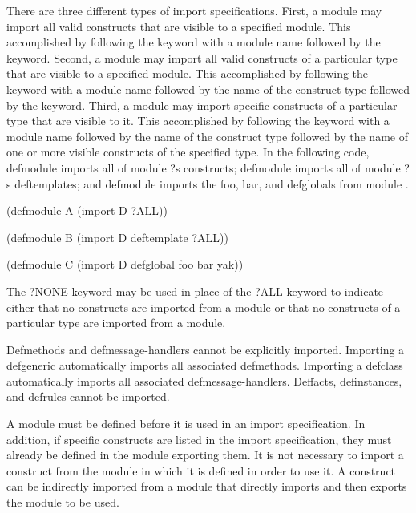 \documentclass[letterpaper,10pt,english]{sphinxmanual}
\begin{document}
There are three different types of import specifications. First, a
module may import all valid constructs that are visible to a specified
module. This accomplished by following the  keyword with a
module name followed by the  keyword. Second, a module may import
all valid constructs of a particular type that are visible to a
specified module. This accomplished by following the  keyword
with a module name followed by the name of the construct type followed
by the  keyword. Third, a module may import specific constructs of
a particular type that are visible to it. This accomplished by following
the  keyword with a module name followed by the name of the
construct type followed by the name of one or more visible constructs of
the specified type. In the following code, defmodule  imports all of
module ?s constructs; defmodule  imports all of module ?s
deftemplates; and defmodule  imports the foo, bar, and 
defglobals from module .

\begin{sphinxVerbatim}[commandchars=\\\{\}]
(defmodule A (import D ?ALL))

(defmodule B (import D deftemplate ?ALL))

(defmodule C (import D defglobal foo bar yak))
\end{sphinxVerbatim}

The ?NONE keyword may be used in place of the ?ALL keyword to indicate
either that no constructs are imported from a module or that no
constructs of a particular type are imported from a module.

Defmethods and defmessage-handlers cannot be explicitly imported.
Importing a defgeneric automatically imports all associated defmethods.
Importing a defclass automatically imports all associated
defmessage-handlers. Deffacts, definstances, and defrules cannot be
imported.

A module must be defined before it is used in an import specification.
In addition, if specific constructs are listed in the import
specification, they must already be defined in the module exporting
them. It is not necessary to import a construct from the module in which
it is defined in order to use it. A construct can be indirectly imported
from a module that directly imports and then exports the module to be
used.
\end{document}
